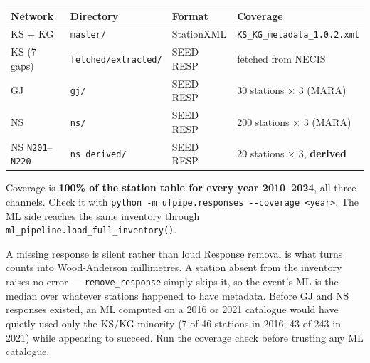 \documentclass[11pt]{article}
\newcommand{\code}[1]{\texttt{#1}}
\begin{document}
\begin{center}\small
\begin{tabular}{@{}llll@{}}
\toprule
\textbf{Network} & \textbf{Directory} & \textbf{Format} & \textbf{Coverage} \\
\midrule
KS + KG & \code{master/} & StationXML & \code{KS\_KG\_metadata\_1.0.2.xml} \\
KS (7 gaps) & \code{fetched/extracted/} & SEED RESP & fetched from NECIS \\
GJ & \code{gj/} & SEED RESP & 30 stations $\times$ 3 (MARA) \\
NS & \code{ns/} & SEED RESP & 200 stations $\times$ 3 (MARA) \\
NS \code{N201}--\code{N220} & \code{ns\_derived/} & SEED RESP & 20 stations $\times$ 3, \textbf{derived} \\
\bottomrule
\end{tabular}
\end{center}

\noindent Coverage is \textbf{100\% of the station table for every year 2010--2024}, all three channels.
Check it with \code{python -m ufpipe.responses -{}-coverage <year>}. The ML side reaches the same inventory
through \code{ml\_pipeline.load\_full\_inventory()}.

\begin{warnbox}{A missing response is silent rather than loud}
Response removal is what turns counts into Wood-Anderson millimetres. A station absent from the inventory
raises no error --- \code{remove\_response} simply skips it, so the event's ML is the median over whatever
stations happened to have metadata. Before GJ and NS responses existed, an ML computed on a 2016 or 2021
catalogue would have quietly used only the KS/KG minority (7 of 46 stations in 2016; 43 of 243 in 2021)
while appearing to succeed. Run the coverage check before trusting any ML catalogue.
\end{warnbox}
\end{document}
